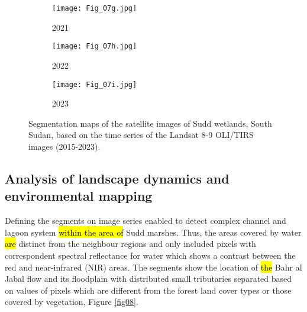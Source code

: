 \documentclass[sustainability,article,submit,pdftex,moreauthors]{Definitions/mdpi}
\begin{document}
\begin{figure}[H]
{	\begin{subfigure}[b]{.40\textwidth}
		\centering
		\texttt{[image: Fig\_07g.jpg]}
		\caption{2021}
	\end{subfigure}%
	\begin{subfigure}[b]{.40\textwidth}
		\centering
		\texttt{[image: Fig\_07h.jpg]}
		\caption{2022}
	\end{subfigure}%
	\begin{subfigure}[b]{.40\textwidth}
		\centering
		\texttt{[image: Fig\_07i.jpg]}
		\caption{2023}
	\end{subfigure}%
}
\caption{Segmentation maps of the satellite images of Sudd wetlands, South Sudan, based on the time series of the Landsat 8-9 OLI/TIRS images (2015-2023).}\label{fig07}
\end{figure}

\subsection{Analysis of landscape dynamics and environmental mapping}

Defining the segments on image series enabled to detect\hl{ }complex channel and lagoon system \hl{within the area of} Sudd marshes. Thus, the areas covered by water \hl{are} distinct from the neighbour regions and only included\hl{ }pixels with correspondent spectral reflectance for water which shows a contrast between the red and near-infrared (NIR) areas. The segments show the location of \hl{the }Bahr al Jabal flow and its floodplain with distributed small tributaries separated based on values of pixels which are different from the forest land cover types or those covered by vegetation, Figure \ref{fig08}. 
\end{document}
